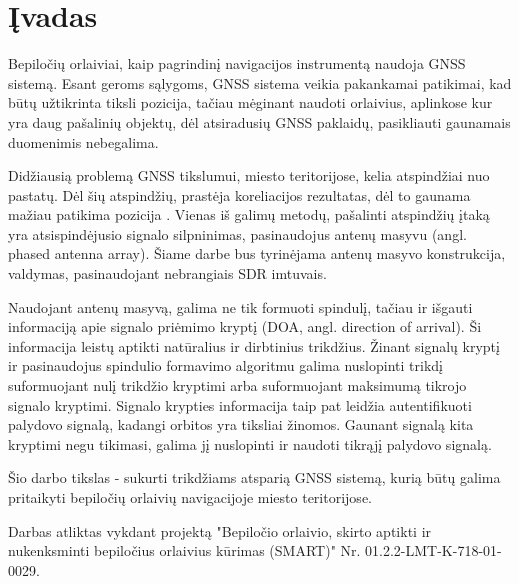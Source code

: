 \documentclass[../gnss_interference_resistant_thesis.tex]{subfiles}
\begin{document}
\section*{Įvadas}

Bepiločių orlaiviai, kaip pagrindinį navigacijos instrumentą naudoja
GNSS sistemą. Esant geroms sąlygoms, GNSS sistema veikia pakankamai
patikimai, kad būtų užtikrinta tiksli pozicija,
tačiau mėginant naudoti orlaivius, aplinkose kur yra daug
pašalinių objektų, dėl atsiradusių GNSS paklaidų, pasikliauti gaunamais
duomenimis nebegalima.

Didžiausią problemą GNSS tikslumui, miesto teritorijose, kelia
atspindžiai nuo pastatų. Dėl šių atspindžių, prastėja
koreliacijos rezultatas, dėl to gaunama mažiau patikima
pozicija \cite{Vagle2016}. Vienas iš galimų metodų,
pašalinti atspindžių įtaką yra atsispindėjusio signalo
silpninimas, pasinaudojus antenų masyvu (angl. phased antenna array).
Šiame darbe bus tyrinėjama antenų masyvo konstrukcija,
valdymas, pasinaudojant nebrangiais SDR imtuvais.

Naudojant antenų masyvą, galima ne tik formuoti spindulį,
tačiau ir išgauti informaciją apie signalo priėmimo kryptį (DOA, angl. direction of arrival).
Ši informacija leistų aptikti natūralius ir dirbtinius trikdžius.
Žinant signalų kryptį ir pasinaudojus spindulio formavimo algoritmu
galima nuslopinti trikdį suformuojant nulį trikdžio kryptimi
arba suformuojant maksimumą tikrojo signalo kryptimi.
Signalo krypties informacija taip pat leidžia autentifikuoti palydovo signalą,
kadangi orbitos yra tiksliai žinomos. Gaunant signalą kita kryptimi
negu tikimasi, galima jį nuslopinti ir naudoti tikrąjį palydovo signalą.

Šio darbo tikslas - sukurti trikdžiams atsparią GNSS sistemą,
kurią būtų galima pritaikyti bepiločių orlaivių navigacijoje miesto
teritorijose.

Darbas atliktas vykdant projektą
"Bepiločio orlaivio, skirto aptikti ir nukenksminti bepiločius orlaivius kūrimas (SMART)"
Nr. 01.2.2-LMT-K-718-01-0029.
\end{document}
